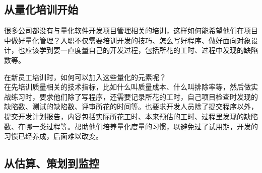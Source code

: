 
\hypertarget{ux4eceux91cfux5316ux57f9ux8badux5f00ux59cb}{%
\subsection{从量化培训开始}\label{ux4eceux91cfux5316ux57f9ux8badux5f00ux59cb}}

很多公司都没有与量化软件开发项目管理相关的培训，这样如何能希望他们在项目中做好量化管理？入职不仅需要培训开发的技巧、怎么写好程序、做好面向对象设计，也应该学到要一直度量自己的开发过程，包括所花的工时、过程中发现的缺陷数等。

在新员工培训时，如何可以加入这些量化的元素呢？\\
在先培训质量相关的技术指标，比如什么叫质量成本、什么叫排除率等，然后做实战练习时，要求他们除了写程序，还需要记录所花的工时，自己项目检查时发现的缺陷数、测试的缺陷数、评审所花的时间等。也要求开发人员除了提交程序以外，提交开发计划报告，内容包括实际所花工时、本来预估的工时、过程里发现的缺陷数、在哪一类过程等。帮助他们培养量化度量的习惯，以避免过了试用期，开发的习惯已经养成，后面难以改变。

\hypertarget{ux4eceux4f30ux7b97ux7b56ux5212ux5230ux76d1ux63a7}{%
\subsection{从估算、策划到监控}\label{ux4eceux4f30ux7b97ux7b56ux5212ux5230ux76d1ux63a7}}

